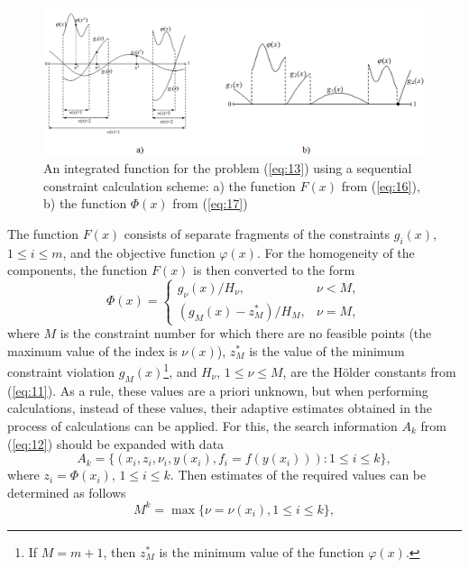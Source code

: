 \documentclass[smallextended]{svjour3}       %
\begin{document}
\begin{figure}
  \centering
  \includegraphics[width=\linewidth]{fig1}
  \caption{An integrated function for the problem (\ref{eq:13}) using a sequential constraint calculation scheme: a) the function $F(x)$ from (\ref{eq:16}), b) the function $\Phi(x)$ from (\ref{eq:17})}
  \label{fig:1}
\end{figure}

The function $F(x)$ consists of separate fragments of the constraints $g_i(x)$, $1 \leq i \leq m$, and the objective function $\varphi(x)$. For the homogeneity of the components, the function $F(x)$ is then converted to the form 
\begin{equation}\label{eq:17}
\Phi (x) = 
 \begin{cases}
   g_\nu(x) / H_\nu, & \nu < M, \\
   (g_M(x)-z^*_M) / H_M, & \nu = M,
 \end{cases}
\end{equation}
where $M$ is the constraint number for which there are no feasible points (the maximum value of the index is $\nu(x)$), $z^*_M$ is the value of the minimum constraint violation $g_M(x)$\footnote{If $M=m+1$, then $z_M^*$ is the minimum value of the function $\varphi(x)$.}, and $H_\nu$, $1\leq \nu \leq M$, are the H\"older constants from (\ref{eq:11}). As a rule, these values are a priori unknown, but when performing calculations, instead of these values, their adaptive estimates obtained in the process of calculations can be applied. For this, the search information $A_k$ from (\ref{eq:12}) should be expanded with data
\begin{equation}\label{eq:18}
A_k=\{(x_i, z_i, \nu_i, y(x_i), f_i=f( y(x_i))): 1 \leq i \leq k \},
\end{equation}
where $z_i= \Phi(x_i)$, $1 \leq i \leq k$. Then estimates of the required values can be determined as follows
\begin{equation}\label{eq:19}
M^k= \max{\{\nu=\nu(x_i), 1\leq i \leq k \}},
\end{equation}
\end{document}
